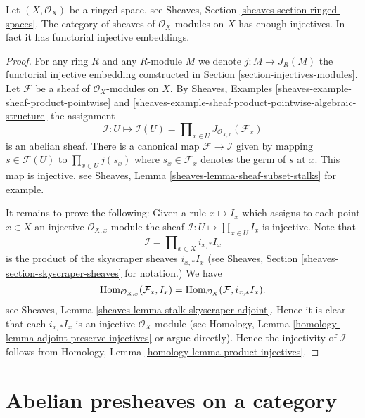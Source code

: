 \begin{lemma}
\label{lemma-sheaves-modules-space}
Let $(X, \mathcal{O}_X)$ be a ringed space, see
Sheaves, Section \ref{sheaves-section-ringed-spaces}.
The category of sheaves of $\mathcal{O}_X$-modules on $X$
has enough injectives. In fact it has functorial injective embeddings.
\end{lemma}

\begin{proof}
For any ring $R$ and any $R$-module $M$ we denote
$j : M \to J_R(M)$ the functorial
injective embedding constructed in Section \ref{section-injectives-modules}.
Let $\mathcal{F}$ be a sheaf of $\mathcal{O}_X$-modules on $X$.
By Sheaves, Examples \ref{sheaves-example-sheaf-product-pointwise}
and \ref{sheaves-example-sheaf-product-pointwise-algebraic-structure}
the assignment
$$
\mathcal{I} : U \mapsto
\mathcal{I}(U) = \prod\nolimits_{x\in U} J_{\mathcal{O}_{X, x}}(\mathcal{F}_x)
$$
is an abelian sheaf.
There is a canonical map $\mathcal{F} \to \mathcal{I}$
given by mapping $s \in \mathcal{F}(U)$ to $\prod_{x \in U} j(s_x)$
where $s_x \in \mathcal{F}_x$ denotes the germ of $s$ at $x$.
This map is injective, see
Sheaves, Lemma \ref{sheaves-lemma-sheaf-subset-stalks}
for example.

\medskip\noindent
It remains to prove the following: Given a rule
$x \mapsto I_x$ which assigns to each point $x \in X$ an injective
$\mathcal{O}_{X, x}$-module
the sheaf $\mathcal{I} : U \mapsto \prod_{x \in U} I_x$
is injective. Note that
$$
\mathcal{I} = \prod\nolimits_{x \in X} i_{x, *}I_x
$$
is the product of the skyscraper sheaves $i_{x, *}I_x$ (see
Sheaves, Section \ref{sheaves-section-skyscraper-sheaves} for notation.)
We have
$$
\mathop{\rm Hom}\nolimits_{\mathcal{O}_{X, x}}(\mathcal{F}_x, I_x)
=
\mathop{\rm Hom}\nolimits_{\mathcal{O}_X}(\mathcal{F}, i_{x, *}I_x).
$$
see Sheaves, Lemma \ref{sheaves-lemma-stalk-skyscraper-adjoint}. Hence it is
clear that each $i_{x, *}I_x$ is an injective $\mathcal{O}_X$-module
(see Homology, Lemma \ref{homology-lemma-adjoint-preserve-injectives} or argue
directly). Hence the injectivity of $\mathcal{I}$ follows from
Homology, Lemma \ref{homology-lemma-product-injectives}.
\end{proof}













\section{Abelian presheaves on a category}
\label{section-injectives-presheaves}

